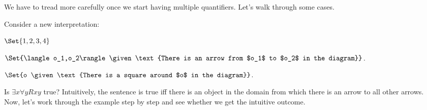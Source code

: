 We have to tread more carefully once we start having multiple quantifiers. Let's walk through some cases.

Consider a new interpretation: \begin{center}

 \begin{interp}
\item[\domain] $\Set{1,2,3,4}$
\item[\denote{R}] $\Set{\langle o_1,o_2\rangle \given \text{There is an arrow from $o_1$ to $o_2$ in the diagram}}$.
\item[\denote{S}] $\Set{o \given \text{There is a square around $o$ in the diagram}}$.
\end{interp}
\end{center}

 Is $\exists x\forall y Rxy$ true? Intuitively, the sentence is true iff there is an object in the domain from which there is an arrow to all other arrows. Now, let's work through the example step by step and see whether we get the intuitive outcome.


